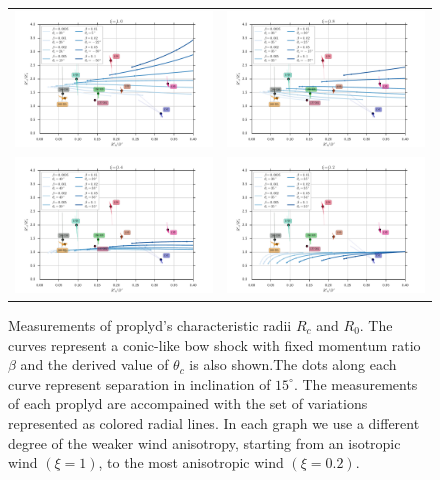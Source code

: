 

 

\begin{figure}
\begin{tabular}{cc}
\includegraphics[width=0.48\linewidth]{../../read-shapes/conic_xi-10} & \includegraphics[width=0.48\linewidth]{../../read-shapes/conic_xi-08} \\
\includegraphics[width=0.48\linewidth]{../../read-shapes/conic_xi-04} & \includegraphics[width=0.48\linewidth]{../../read-shapes/conic_xi-02} 
\end{tabular}
\caption{Measurements of proplyd's characteristic radii $R_c$ and $R_0$. The curves represent a conic-like bow shock with 
fixed momentum ratio $\beta$ and the derived value of $\theta_c$ is also shown.The dots along each curve represent separation in inclination of 
$15^\circ$. The measurements of each proplyd are accompained with the set of variations represented as colored radial lines. In 
each graph we use a different degree of the weaker wind anisotropy, starting from an isotropic wind $(\xi=1)$, to the most anisotropic wind
$(\xi=0.2)$.}
\label{fig:conic-xi}
\end{figure}

